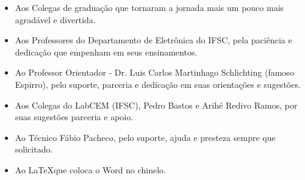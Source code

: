 \documentclass{ifscTCC} %
\begin{document}
\begin{agradecimentos}
    \begin{itemize}
        \item Aos Colegas de graduação que tornaram a jornada mais um pouco mais agradável e divertida.
        \item Aos Professores do Departamento de Eletrônica do IFSC, pela paciência e dedicação que empenham em seus ensinamentos.
        \item Ao Professor Orientador - Dr. Luis Carlos Martinhago Schlichting (famoso Espirro), pelo suporte, parceria e dedicação em suas orientações e sugestões.
        \item Aos Colegas do LabCEM (IFSC), Pedro Bastos e Arihé Redivo Ramos, por suas sugestões parceria e apoio.
        \item Ao Técnico Fábio Pacheco, pelo suporte, ajuda e presteza sempre que solicitado.
        \item Ao \LaTeX que coloca o Word no chinelo.
    \end{itemize}

\end{agradecimentos}


%	
%    

\setlength{\absparsep}{18pt} %
\end{document}
